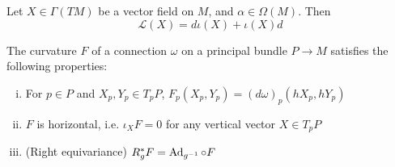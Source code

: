 \begin{thm} 
	\label{thm:cartan_homotopy} %
	Let $X\in \Gamma(TM)$ be a vector field on $M$, and $\alpha\in \Omega(M)$. Then
	\[
	\mathcal{L}(X) = d\iota(X)+\iota(X) d
	\] 
	\begin{comment}
	\begin{enumerate}[(i)]
	    \item $\mathcal{L}(X)d = d\mathcal{L}(X)$
		\item $\mathcal{L}(X)(\iota(Y)\alpha) = \iota([X,Y])\alpha +
			\iota(Y)(\mathcal{L}(X)\alpha)$ 
		\item Cartan's homotopy formula: $\mathcal{L}(X) = d
			\cdot\iota(X)+\iota(X)\cdot d$
	\end{enumerate}
	\end{comment}
\end{thm}

\begin{thm} \label{thm:pb_curvature_properties}
	The curvature $F$ of a connection  $\omega$ on a principal  bundle $P\to M$
	satisfies the following properties:
	\begin{enumerate}[(i)]
	    \item For $p\in P$ and  $X_p,Y_p\in T_pP$,  $F_p(X_p,Y_p) =
			(d\omega)_p(hX_p,hY_p)$
		 \item $F$ is horizontal, i.e. $\iota_X F = 0$ for any vertical
			 vector  $X\in T_pP$
		\item (Right equivariance) $R_g^*F = \operatorname{Ad}_{g^{-1}}\circ F$
	\end{enumerate}
\end{thm}

